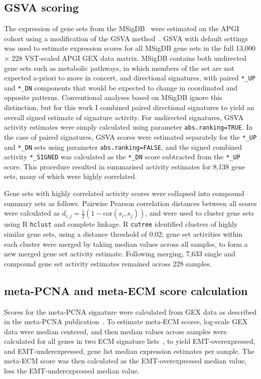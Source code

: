 \documentclass[dissertation.tex]{subfiles}
\begin{document}
\subsection{\acrshort{GSVA} scoring}
The expression of gene sets from the \gls{MSigDB}~\cite{Subramanian2005} were estimated on the \gls{APGI} cohort using a modification of the \gls{GSVA} method~\cite{Hanzelmann2013}.  \gls{GSVA} with default settings was used to estimate expression scores for all \gls{MSigDB} gene sets in the full 13,000 $\times$ 228 \gls{VST}-scaled \gls{APGI} \gls{GEX} data matrix.  \gls{MSigDB} contains both undirected gene sets such as metabolic pathways, in which members of the set are not expected a-priori to move in concert, and directional signatures, with paired \texttt{*\_UP} and \texttt{*\_DN} components that would be expected to change in coordinated and opposite patterns.  Conventional analyses based on \gls{MSigDB} ignore this distinction, but for this work I combined paired directional signatures to yield an overall signed estimate of signature activity.  For undirected signatures, \gls{GSVA} activity estimates were simply calculated using parameter \texttt{abs.ranking=TRUE}.  In the case of paired signatures, \gls{GSVA} scores were estimated separately for the \texttt{*\_UP} and \texttt{*\_DN} sets using parameter \texttt{abs.ranking=FALSE}, and the signed combined activity \texttt{*\_SIGNED} was calculated as the \texttt{*\_DN} score subtracted from the \texttt{*\_UP} score.  This procedure resulted in summarised activity estimates for 8,138 gene sets, many of which were highly correlated.

Gene sets with highly correlated activity scores were collapsed into compound summary sets as follows.  Pairwise Pearson correlation distances between all scores were calculated as $d_{i,j} = \frac{1}{2}(1 - \text{cor}(s_i, s_j))$, and were used to cluster gene sets using R \texttt{hclust} and complete linkage.  R \texttt{cutree} identified clusters of highly similar gene sets, using a distance threshold of 0.02; gene set activities within each cluster were merged by taking median values across all samples, to form a new merged gene set activity estimate.  Following merging, 7,633 single and compound gene set activity estimates remained across 228 samples.

\subsection{meta-PCNA and meta-ECM score calculation}
Scores for the meta-PCNA signature were calculated from \gls{GEX} data as described in the meta-PCNA publication~\cite{Venet2011}.  To estimate meta-ECM scores, log-scale \gls{GEX} data were median centered, and then median values across samples were calculated for all genes in two ECM signature lists~\cite[Table~S3]{Groger2012}, to yield EMT-overexpressed, and EMT-underexpressed, gene list median expression estimates per sample.  The meta-ECM score was then calculated as the EMT-overexpressed median value, less the EMT-underexpressed median value.
\end{document}
